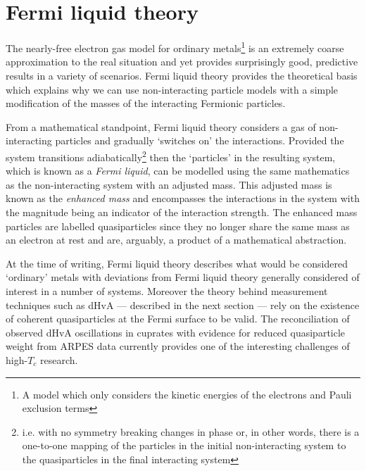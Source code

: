 

\section{Fermi liquid theory}
    \label{Sec:Theo:FermiLiquidTheory}

The nearly-free electron gas model for ordinary metals\footnote{A model which only considers the kinetic energies of the electrons and Pauli exclusion terms} is an extremely coarse approximation to the real situation and yet provides surprisingly good, predictive results in a variety of scenarios. Fermi liquid theory provides the theoretical basis which explains why we can use non-interacting particle models with a simple modification of the masses of the interacting Fermionic particles.

From a mathematical standpoint, Fermi liquid theory considers a gas of non-interacting particles and gradually `switches on' the interactions. Provided the system transitions adiabatically\footnote{i.e. with no symmetry breaking changes in phase or, in other words, there is a one-to-one mapping of the particles in the initial non-interacting system to the quasiparticles in the final interacting system} then the `particles' in the resulting system, which is known as a \emph{Fermi liquid}, can be modelled using the same mathematics as the non-interacting system with an adjusted mass. This adjusted mass is known as the \emph{enhanced mass} and encompasses the interactions in the system with the magnitude being an indicator of the interaction strength. The enhanced mass particles are labelled quasiparticles since they no longer share the same mass as an electron at rest and are, arguably, a product of a mathematical abstraction.

At the time of writing, Fermi liquid theory describes what would be considered `ordinary' metals with deviations from Fermi liquid theory generally considered of interest in a number of systems. Moreover the theory behind measurement techniques such as \ac{dHvA} --- described in the next section --- rely on the existence of coherent quasiparticles at the Fermi surface to be valid. The reconciliation of observed \ac{dHvA} oscillations in cuprates with evidence for reduced quasiparticle weight from \ac{ARPES} data currently provides one of the interesting challenges of high-$T_c$ research.

